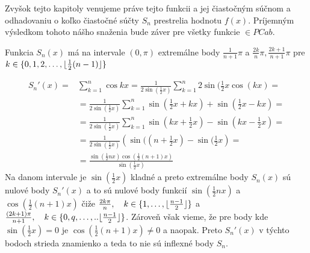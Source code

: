 Zvyšok tejto kapitoly venujeme práve tejto funkcii a jej čiastočným
súčnom a odhadovaniu o koľko čiastočné súčty $S_n$ prestrelia hodnotu
$f(x)$. Príjemným výsledkom tohoto nášho snaženia bude záver pre
všetky funkcie $\in PCab$.

\begin{lema}
    Funkcia $S_n(x)$ má na intervale $(0,\pi)$ extremálne body
    $\frac{1}{n+1}\pi$ a
    $\frac{2k}{n}\pi, \frac{2k+1}{n+1}\pi$ pre
    $k \in \{0,1,2,\dots,\lfloor \frac{1}{2}(n-1) \rfloor \}$
\end{lema}
\begin{dokaz}
    \begin{eqnarray}
        S_n'(x) =& \sum_{k=1}^n \cos kx = 
            \frac{1}{2\sin(\frac{1}{2}x)} \sum_{k=1}^n 2
            \sin(\frac{1}{2}x \cos(kx) =\\
            &=\frac{1}{2\sin(\frac{1}{2}x)} \sum_{k=1}^n
                \sin(\frac{1}{2}x + kx) +
                \sin(\frac{1}{2}x - kx) = \\
            &=\frac{1}{2\sin(\frac{1}{2}x)} \sum_{k=1}^n
                \sin(kx + \frac{1}{2}x ) -
                \sin(kx - \frac{1}{2}x ) = \\
            &=\frac{1}{2\sin(\frac{1}{2}x)} 
                \left(
                    \sin((n+\frac{1}{2}x) - \sin(\frac{1}{2}x
                \right) = \\
            &=\frac{ \sin(\frac{1}{2}nx) \cos(\frac{1}{2}(n+1)x)}
                {\sin(\frac{1}{2} x)}
    \end{eqnarray}
    Na danom intervale je $\sin(\frac{1}{2} x)$ kladné a preto
    extremálne body $S_n(x)$ sú nulové
    body $S_n'(x)$ a to sú nulové body funkcií
     $\sin(\frac{1}{2}nx)$ a $\cos(\frac{1}{2}(n+1)x)$ čiže
     $\frac{2 k \pi}{n},\quad k\in \{1,\dots,\lfloor \frac{n-1}{2} \rfloor\}$ a
     $\frac{(2k+1)\pi}{n+1},\quad k\in
     \{0,q,\dots,..\lfloor \frac{n-1}{2} \rfloor\}$. Zároveň však
     vieme, že pre body kde $\sin(\frac{1}{2} x)=0$ je
     $\cos(\frac{1}{2}(n+1)x)\not=0$ a naopak.
     Preto $S_n'(x)$ v týchto bodoch strieda znamienko a teda to nie
     sú inflexné body $S_n$.
\end{dokaz}

